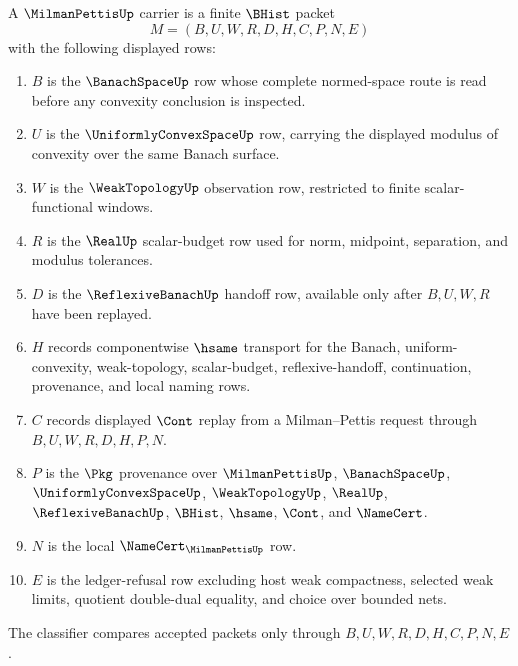 \begin{definition}
\label{def:milman-pettis-carrier}
A $\MilmanPettisUp$ carrier is a finite $\BHist$ packet
$$
M=(B,U,W,R,D,H,C,P,N,E)
$$
with the following displayed rows:
\begin{enumerate}
\item $B$ is the $\BanachSpaceUp$ row whose complete normed-space route is read before any convexity conclusion is inspected.
\item $U$ is the $\UniformlyConvexSpaceUp$ row, carrying the displayed modulus of convexity over the same Banach surface.
\item $W$ is the $\WeakTopologyUp$ observation row, restricted to finite scalar-functional windows.
\item $R$ is the $\RealUp$ scalar-budget row used for norm, midpoint, separation, and modulus tolerances.
\item $D$ is the $\ReflexiveBanachUp$ handoff row, available only after $B,U,W,R$ have been replayed.
\item $H$ records componentwise $\hsame$ transport for the Banach, uniform-convexity, weak-topology, scalar-budget, reflexive-handoff, continuation, provenance, and local naming rows.
\item $C$ records displayed $\Cont$ replay from a Milman--Pettis request through $B,U,W,R,D,H,P,N$.
\item $P$ is the $\Pkg$ provenance over $\MilmanPettisUp$, $\BanachSpaceUp$, $\UniformlyConvexSpaceUp$, $\WeakTopologyUp$, $\RealUp$, $\ReflexiveBanachUp$, $\BHist$, $\hsame$, $\Cont$, and $\NameCert$.
\item $N$ is the local $\NameCert_{\MilmanPettisUp}$ row.
\item $E$ is the ledger-refusal row excluding host weak compactness, selected weak limits, quotient double-dual equality, and choice over bounded nets.
\end{enumerate}
The classifier compares accepted packets only through $B,U,W,R,D,H,C,P,N,E$.
\end{definition}

